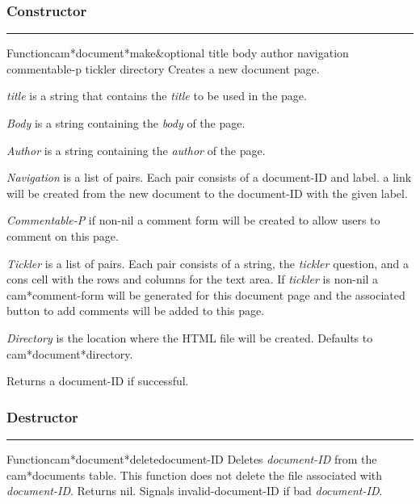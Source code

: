 \subsubsection*{Constructor}
\par\vspace*{0.00in}\par\hrule\par\medskip\par


\begin{functiondoc}{Function}{cam*document*make}{\&optional title body author navigation commentable-p tickler directory}
Creates a new document page.


{\em title} is a string that contains the {\em title} to be used in the page.

{\em Body} is a string containing the {\em body} of the page.

{\em Author} is a string containing the {\em author} of the page. 

{\em Navigation} is a list of pairs.  Each pair consists of a document-ID and label.
 a link will be created from the new document to the document-ID with the given label.

{\em Commentable-P} if non-nil a comment form will be created to allow users to comment
 on this page.

{\em Tickler} is a list of pairs.  Each pair consists of a string, the {\em tickler} question, and
 a cons cell with the rows and columns for the text area.  If {\em tickler} is non-nil a
 cam*comment-form will be generated for this document page and the associated button
 to add comments will be added to this page.

{\em Directory} is the location where the HTML file will be created.  Defaults to
 cam*document*directory.

Returns a document-ID if successful.
\end{functiondoc}


\subsubsection*{Destructor}
\par\vspace*{0.00in}\par\hrule\par\medskip\par


\begin{functiondoc}{Function}{cam*document*delete}{document-ID}
Deletes {\em document-ID} from the cam*documents table.
This function does not delete the file associated with {\em document-ID}.
Returns nil.
Signals invalid-document-ID if bad {\em document-ID}.
\end{functiondoc}


